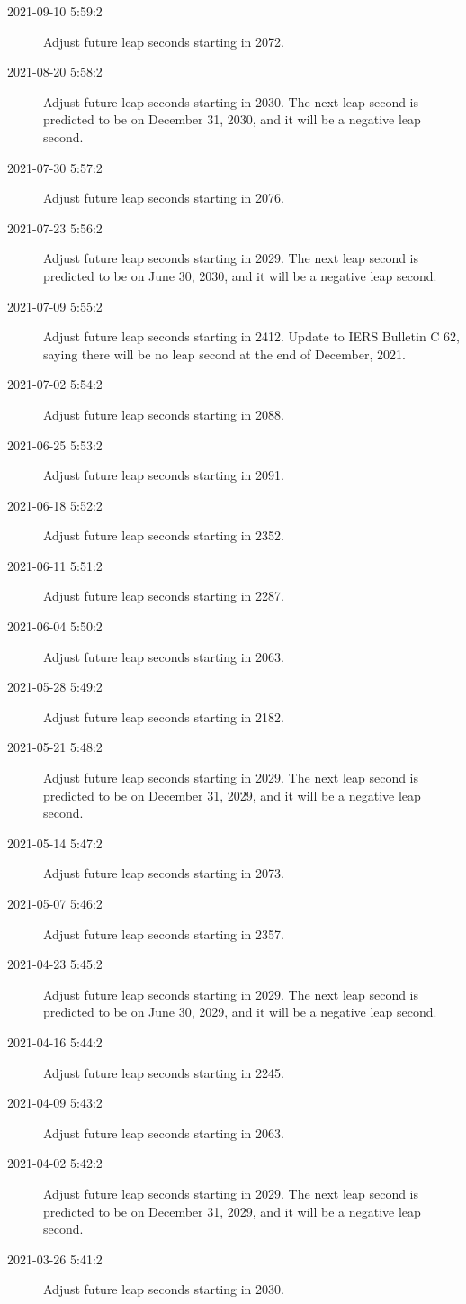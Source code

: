 \documentclass[letterpaper,twoside]{article}
\begin{document}
\begin{description}
\item[2021-09-10 5:59:2]Adjust future leap seconds starting in 2072.
\item[2021-08-20 5:58:2]Adjust future leap seconds starting in 2030.
  The next leap second is predicted to be on December 31, 2030, and it
  will be a negative leap second.
\item[2021-07-30 5:57:2]Adjust future leap seconds starting in 2076.
\item[2021-07-23 5:56:2]Adjust future leap seconds starting in 2029.
  The next leap second is predicted to be on June 30, 2030, and it
  will be a negative leap second.
\item[2021-07-09 5:55:2]Adjust future leap seconds starting in 2412.
  Update to IERS Bulletin C 62, saying there will be no leap second
  at the end of December, 2021.
\item[2021-07-02 5:54:2]Adjust future leap seconds starting in 2088.
\item[2021-06-25 5:53:2]Adjust future leap seconds starting in 2091.
\item[2021-06-18 5:52:2]Adjust future leap seconds starting in 2352.
\item[2021-06-11 5:51:2]Adjust future leap seconds starting in 2287.
\item[2021-06-04 5:50:2]Adjust future leap seconds starting in 2063.
\item[2021-05-28 5:49:2]Adjust future leap seconds starting in 2182.
\item[2021-05-21 5:48:2]Adjust future leap seconds starting in 2029.
  The next leap second is predicted to be on December 31, 2029, and
  it will be a negative leap second.
\item[2021-05-14 5:47:2]Adjust future leap seconds starting in 2073.
\item[2021-05-07 5:46:2]Adjust future leap seconds starting in 2357.
\item[2021-04-23 5:45:2]Adjust future leap seconds starting in 2029.
  The next leap second is predicted to be on June 30, 2029, and
  it will be a negative leap second.
\item[2021-04-16 5:44:2]Adjust future leap seconds starting in 2245.
\item[2021-04-09 5:43:2]Adjust future leap seconds starting in 2063.
\item[2021-04-02 5:42:2]Adjust future leap seconds starting in 2029.
  The next leap second is predicted to be on December 31, 2029, and
  it will be a negative leap second.
\item[2021-03-26 5:41:2]Adjust future leap seconds starting in 2030.

\end{description}
\end{document}
